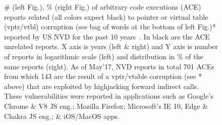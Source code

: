 \begin{figure}[t!]
\centering
{}
\vspace{-.7cm}
\caption{\# (left Fig.), \% (right Fig.) of arbitrary code executions (ACE) reports related (all colors expect black) to pointer or virtual table (vptr/vtbl) corruption 
(see bag of words at the bottom of left Fig.)* reported by US NVD for the past 10 years~\cite{NVD:ACE}. In black are the ACE unrelated reports.
X axis is years (left \& right) and Y axis is number of reports in logarithmic scale (left) and distribution in \% of the same reports (right).
As of May'17, NVD reports in total 701 ACEs from which 143 are the result of a vptr/vtable corruption (see * above) that are exploited by highjacking forward indirect calls.
These vulnerabilities were reported in applications such as Google's Chrome \& V8 JS eng.; Mozilla Firefox; Microsoft's IE 10, Edge \& Chakra JS eng.;
\& iOS/MacOS apps.}
\label{ace:nvd:statistics}
\vspace{-.7cm}
\end{figure}


